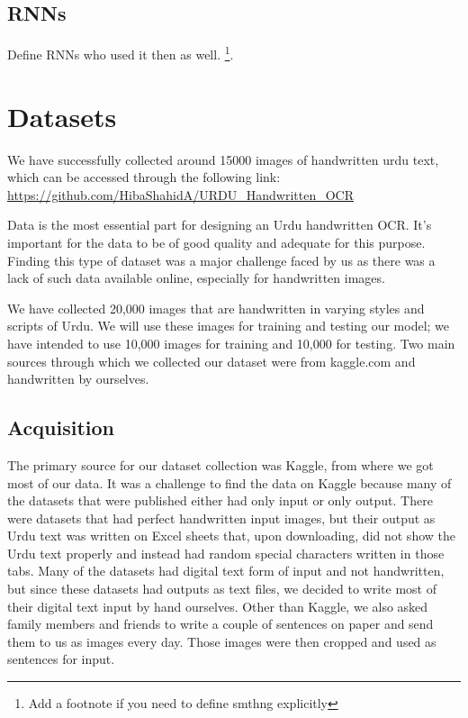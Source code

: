 \documentclass[11pt,twocolumn,twoside]{article} %
\begin{document}
\subsection{RNNs}
Define RNNs who used it \cite{rizvi2018ocr} then as well.
\footnote{ Add a footnote if you need to define smthng explicitly}.


\section{Datasets}
We have successfully collected around 15000 images of handwritten urdu text, which can be accessed through the following link:\\
\url{https://github.com/HibaShahidA/URDU_Handwritten_OCR}

Data is the most essential part for designing an Urdu handwritten OCR. It's important for the data to be of good quality and adequate for this purpose. Finding this type of dataset was a major challenge faced by us as there was a lack of such data available online, especially for handwritten images.

We have collected 20,000 images that are handwritten in varying styles and scripts of Urdu. We will use these images for training and testing our model; we have intended to use 10,000 images for training and 10,000 for testing. Two main sources through which we collected our dataset were from kaggle.com and handwritten by ourselves.

\subsection{Acquisition}
The primary source for our dataset collection was Kaggle, from where we got most of our data. It was a challenge to find the data on Kaggle because many of the datasets that were published either had only input or only output. There were datasets that had perfect handwritten input images, but their output as Urdu text was written on Excel sheets that, upon downloading, did not show the Urdu text properly and instead had random special characters written in those tabs. Many of the datasets had digital text form of input and not handwritten, but since these datasets had outputs as text files, we decided to write most of their digital text input by hand ourselves. Other than Kaggle, we also asked family members and friends to write a couple of sentences on paper and send them to us as images every day. Those images were then cropped and used as sentences for input.
\end{document}
